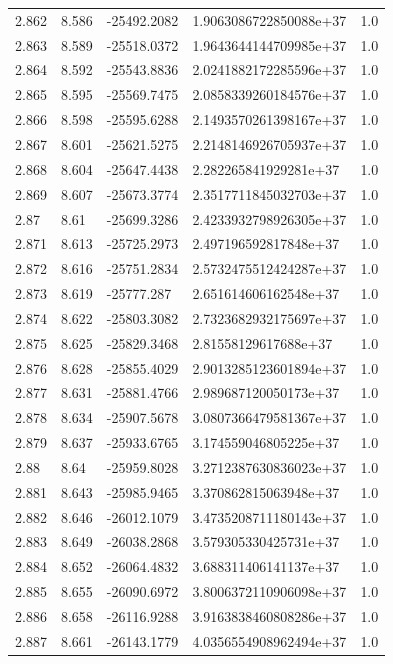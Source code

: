 \begin{tabular}{lllll}
2.862 & 8.586 & -25492.2082 & 1.9063086722850088e+37 & 1.0 \\
2.863 & 8.589 & -25518.0372 & 1.9643644144709985e+37 & 1.0 \\
2.864 & 8.592 & -25543.8836 & 2.0241882172285596e+37 & 1.0 \\
2.865 & 8.595 & -25569.7475 & 2.0858339260184576e+37 & 1.0 \\
2.866 & 8.598 & -25595.6288 & 2.1493570261398167e+37 & 1.0 \\
2.867 & 8.601 & -25621.5275 & 2.2148146926705937e+37 & 1.0 \\
2.868 & 8.604 & -25647.4438 & 2.282265841929281e+37 & 1.0 \\
2.869 & 8.607 & -25673.3774 & 2.3517711845032703e+37 & 1.0 \\
2.87 & 8.61 & -25699.3286 & 2.4233932798926305e+37 & 1.0 \\
2.871 & 8.613 & -25725.2973 & 2.497196592817848e+37 & 1.0 \\
2.872 & 8.616 & -25751.2834 & 2.5732475512424287e+37 & 1.0 \\
2.873 & 8.619 & -25777.287 & 2.651614606162548e+37 & 1.0 \\
2.874 & 8.622 & -25803.3082 & 2.7323682932175697e+37 & 1.0 \\
2.875 & 8.625 & -25829.3468 & 2.81558129617688e+37 & 1.0 \\
2.876 & 8.628 & -25855.4029 & 2.9013285123601894e+37 & 1.0 \\
2.877 & 8.631 & -25881.4766 & 2.989687120050173e+37 & 1.0 \\
2.878 & 8.634 & -25907.5678 & 3.0807366479581367e+37 & 1.0 \\
2.879 & 8.637 & -25933.6765 & 3.174559046805225e+37 & 1.0 \\
2.88 & 8.64 & -25959.8028 & 3.2712387630836023e+37 & 1.0 \\
2.881 & 8.643 & -25985.9465 & 3.370862815063948e+37 & 1.0 \\
2.882 & 8.646 & -26012.1079 & 3.4735208711180143e+37 & 1.0 \\
2.883 & 8.649 & -26038.2868 & 3.579305330425731e+37 & 1.0 \\
2.884 & 8.652 & -26064.4832 & 3.688311406141137e+37 & 1.0 \\
2.885 & 8.655 & -26090.6972 & 3.8006372110906098e+37 & 1.0 \\
2.886 & 8.658 & -26116.9288 & 3.9163838460808286e+37 & 1.0 \\
2.887 & 8.661 & -26143.1779 & 4.0356554908962494e+37 & 1.0 \\

\end{tabular}
